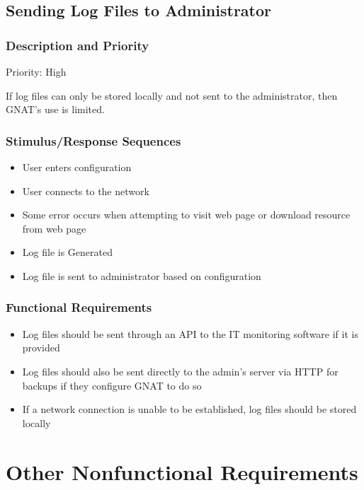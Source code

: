 \documentclass{scrreprt}
\begin{document}
\section{Sending Log Files to Administrator}

\subsection{Description and Priority}

Priority: High

If log files can only be stored locally and not sent to the administrator, then GNAT's use is limited.

\subsection{Stimulus/Response Sequences}

\begin{itemize}
  \item User enters configuration
  \item User connects to the network
  \item Some error occurs when attempting to visit web page or download resource from web page
  \item Log file is Generated
  \item Log file is sent to administrator based on configuration
\end{itemize}

\subsection{Functional Requirements}

\begin{itemize}
  \item Log files should be sent through an API to the IT monitoring software if it is provided
  \item Log files should also be sent directly to the admin's server via HTTP for backups if they configure GNAT to do so
  \item If a network connection is unable to be established, log files should be stored locally
\end{itemize}



\chapter{Other Nonfunctional Requirements}
\end{document}
